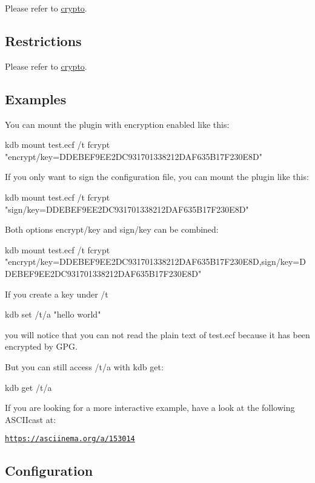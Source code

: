 Please refer to \hyperlink{md_src_plugins_crypto_README_src_plugins_crypto_README_md}{crypto}.

\subsection*{Restrictions}

Please refer to \hyperlink{md_src_plugins_crypto_README_src_plugins_crypto_README_md}{crypto}.

\subsection*{Examples}

You can mount the plugin with encryption enabled like this\+: \begin{DoxyVerb}kdb mount test.ecf /t fcrypt "encrypt/key=DDEBEF9EE2DC931701338212DAF635B17F230E8D"
\end{DoxyVerb}


If you only want to sign the configuration file, you can mount the plugin like this\+: \begin{DoxyVerb}kdb mount test.ecf /t fcrypt "sign/key=DDEBEF9EE2DC931701338212DAF635B17F230E8D"
\end{DoxyVerb}


Both options {\ttfamily encrypt/key} and {\ttfamily sign/key} can be combined\+: \begin{DoxyVerb}kdb mount test.ecf /t fcrypt "encrypt/key=DDEBEF9EE2DC931701338212DAF635B17F230E8D,sign/key=DDEBEF9EE2DC931701338212DAF635B17F230E8D"
\end{DoxyVerb}


If you create a key under {\ttfamily /t} \begin{DoxyVerb}kdb set /t/a "hello world"
\end{DoxyVerb}


you will notice that you can not read the plain text of {\ttfamily test.\+ecf} because it has been encrypted by G\+PG.

But you can still access {\ttfamily /t/a} with {\ttfamily kdb get}\+: \begin{DoxyVerb}kdb get /t/a
\end{DoxyVerb}


If you are looking for a more interactive example, have a look at the following A\+S\+C\+I\+Icast at\+:

\href{https://asciinema.org/a/153014}{\tt https\+://asciinema.\+org/a/153014}

\subsection*{Configuration}

